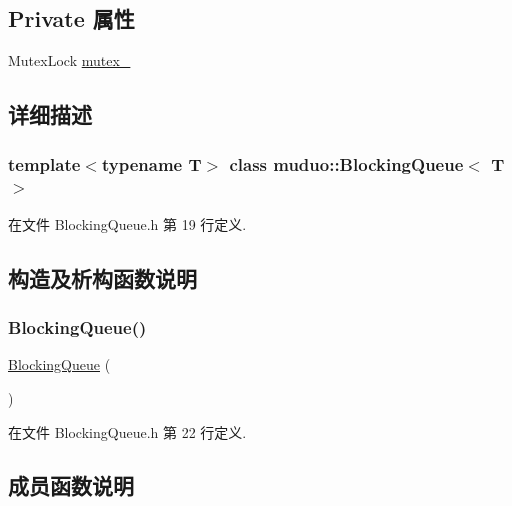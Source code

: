 \subsection*{Private 属性}
\begin{DoxyCompactItemize}
\item 
Mutex\+Lock \hyperlink{classmuduo_1_1BlockingQueue_a6e1bf1809a42f40f1a21178dc6620a6f}{mutex\+\_\+}
\end{DoxyCompactItemize}


\subsection{详细描述}
\subsubsection*{template$<$typename T$>$\newline
class muduo\+::\+Blocking\+Queue$<$ T $>$}



在文件 Blocking\+Queue.\+h 第 19 行定义.



\subsection{构造及析构函数说明}
\mbox{\label{classmuduo_1_1BlockingQueue_ad639c03895ae86de2f4e6cda0c2d3a71}} 
\subsubsection{\texorpdfstring{Blocking\+Queue()}{BlockingQueue()}}
{\footnotesize\ttfamily \hyperlink{classmuduo_1_1BlockingQueue}{Blocking\+Queue} (\begin{DoxyParamCaption}{ }\end{DoxyParamCaption})\hspace{0.3cm}{\ttfamily [inline]}}



在文件 Blocking\+Queue.\+h 第 22 行定义.



\subsection{成员函数说明}
\mbox{\label{classmuduo_1_1BlockingQueue_adc809585805fc6f065fa7414c29ab2af}} 
